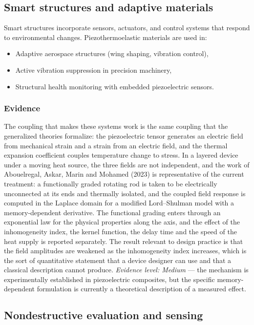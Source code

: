 \subsection{Smart structures and adaptive materials}
\label{sec:13.1}

Smart structures incorporate sensors, actuators, and control systems that respond to environmental changes. Piezothermoelastic materials are used in:
\begin{itemize}
\item Adaptive aerospace structures (wing shaping, vibration control),
\item Active vibration suppression in precision machinery,
\item Structural health monitoring with embedded piezoelectric sensors.
\end{itemize}

\subsubsection{Evidence}
The coupling that makes these systems work is the same coupling that the generalized theories formalize: the piezoelectric tensor generates an electric field from mechanical strain and a strain from an electric field, and the thermal expansion coefficient couples temperature change to stress. In a layered device under a moving heat source, the three fields are not independent, and the work of Abouelregal, Askar, Marin and Mohamed (2023) \cite{Abouelregal2023} is representative of the current treatment: a functionally graded rotating rod is taken to be electrically unconnected at its ends and thermally isolated, and the coupled field response is computed in the Laplace domain for a modified Lord--Shulman model with a memory-dependent derivative. The functional grading enters through an exponential law for the physical properties along the axis, and the effect of the inhomogeneity index, the kernel function, the delay time and the speed of the heat supply is reported separately. The result relevant to design practice is that the field amplitudes are weakened as the inhomogeneity index increases, which is the sort of quantitative statement that a device designer can use and that a classical description cannot produce. \emph{Evidence level: Medium} --- the mechanism is experimentally established in piezoelectric composites, but the specific memory-dependent formulation is currently a theoretical description of a measured effect.

\subsection{Nondestructive evaluation and sensing}
\label{sec:13.2}

